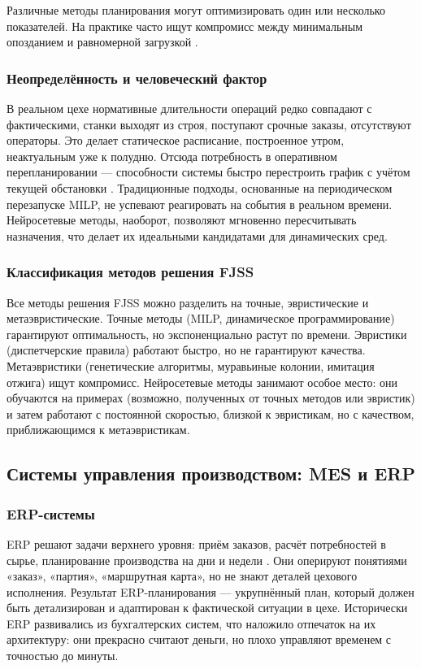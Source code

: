 Различные методы планирования могут оптимизировать один или несколько показателей. На практике часто ищут компромисс между минимальным опозданием и равномерной загрузкой \cite{ISOP}.

\subsubsection{Неопределённость и человеческий фактор}

В реальном цехе нормативные длительности операций редко совпадают с фактическими, станки выходят из строя, поступают срочные заказы, отсутствуют операторы. Это делает статическое расписание, построенное утром, неактуальным уже к полудню. Отсюда потребность в оперативном перепланировании — способности системы быстро перестроить график с учётом текущей обстановки \cite{gvoz}. Традиционные подходы, основанные на периодическом перезапуске MILP, не успевают реагировать на события в реальном времени. Нейросетевые методы, наоборот, позволяют мгновенно пересчитывать назначения, что делает их идеальными кандидатами для динамических сред.

\subsubsection{Классификация методов решения FJSS}

Все методы решения FJSS можно разделить на точные, эвристические и метаэвристические. Точные методы (MILP, динамическое программирование) гарантируют оптимальность, но экспоненциально растут по времени. Эвристики (диспетчерские правила) работают быстро, но не гарантируют качества. Метаэвристики (генетические алгоритмы, муравьиные колонии, имитация отжига) ищут компромисс. Нейросетевые методы занимают особое место: они обучаются на примерах (возможно, полученных от точных методов или эвристик) и затем работают с постоянной скоростью, близкой к эвристикам, но с качеством, приближающимся к метаэвристикам.

\subsection{Системы управления производством: MES и ERP}

\subsubsection{ERP-системы}

ERP решают задачи верхнего уровня: приём заказов, расчёт потребностей в сырье, планирование производства на дни и недели \cite{machinostroy}. Они оперируют понятиями «заказ», «партия», «маршрутная карта», но не знают деталей цехового исполнения. Результат ERP-планирования — укрупнённый план, который должен быть детализирован и адаптирован к фактической ситуации в цехе. Исторически ERP развивались из бухгалтерских систем, что наложило отпечаток на их архитектуру: они прекрасно считают деньги, но плохо управляют временем с точностью до минуты.

